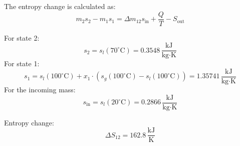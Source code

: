 The entropy change is calculated as:  
\[
m_2 s_2 - m_1 s_1 = \Delta m_{12} s_{\text{in}} + \frac{Q}{T} - S_{\text{out}}
\]  

For state 2:  
\[
s_2 = s_l(70^\circ\text{C}) = 0.3548 \, \frac{\text{kJ}}{\text{kg·K}}
\]  
For state 1:  
\[
s_1 = s_l(100^\circ\text{C}) + x_1 \cdot \left( s_g(100^\circ\text{C}) - s_l(100^\circ\text{C}) \right) = 1.35741 \, \frac{\text{kJ}}{\text{kg·K}}
\]  
For the incoming mass:  
\[
s_{\text{in}} = s_l(20^\circ\text{C}) = 0.2866 \, \frac{\text{kJ}}{\text{kg·K}}
\]  

Entropy change:  
\[
\Delta S_{12} = 162.8 \, \frac{\text{kJ}}{\text{K}}
\]